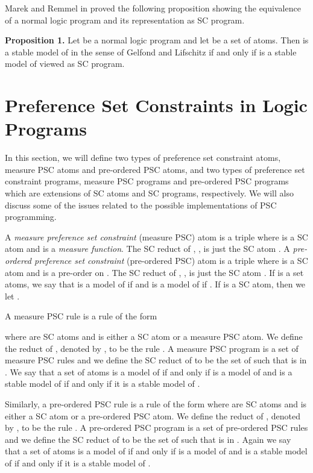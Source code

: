 \documentclass[letterpaper]{article}\usepackage{aaai}
\begin{document}
Marek and Remmel in \cite{MR} proved the following proposition showing the
equivalence of a normal logic program and its representation as SC program.

\textbf{Proposition 1.} Let  be a normal logic program and let  be a set
of atoms. Then  is a stable model of  in the sense of Gelfond and
Lifschitz if and only if  is a stable model of  viewed as SC program.

\section{Preference Set Constraints in Logic Programs}

In this section, we will define two types of preference set constraint atoms,
measure PSC atoms and pre-ordered PSC atoms, and two types of preference set
constraint programs, measure PSC programs and pre-ordered PSC programs which
are extensions of SC atoms and SC programs, respectively. We will also discuss
some of the issues related to the possible implementations of PSC programming.

A \emph{measure preference set constraint} (measure PSC) atom is a triple
 where  is a SC
atom and  is a \emph{measure
function}. The SC reduct of ,
, is just the SC atom .
A \emph{pre-ordered preference set constraint} (pre-ordered PSC) atom is a
triple  where  is
a SC atom and  is a pre-order on . The SC reduct of , , is just the
SC atom . If  is a set atoms, we say that  is a
model of  if  and  is a model of  if
. If  is a SC atom, then we
let .

A measure PSC rule  is a rule of the form

where  are SC atoms and  is either a SC atom or a
measure PSC atom. We define the  reduct of , denoted by , to be
the rule . A measure PSC program  is a
set of measure PSC rules and we define the SC reduct of  to be the set of
 such that  is in . We say that a set of atoms  is a model of
 if and only if  is a model of  and  is a stable model of 
if and only if it is a stable model of .

Similarly, a pre-ordered PSC rule  is a rule of the form  where  are SC atoms and  is either
a SC atom or a pre-ordered PSC atom. We define the  reduct of , denoted
by , to be the rule . A
pre-ordered PSC program  is a set of pre-ordered PSC rules and we define
the SC reduct of  to be the set of  such that  is in . Again
we say that a set of atoms  is a model of  if and only if  is a model
of  and  is a stable model of  if and only if it is a stable
model of .
\end{document}
